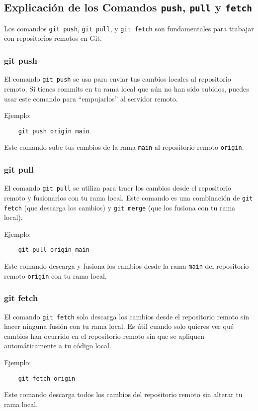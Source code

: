     \subsection{Explicaci\'on de los Comandos \texttt{push}, \texttt{pull} y \texttt{fetch}}

        Los comandos \texttt{git push}, \texttt{git pull}, y \texttt{git fetch} son fundamentales para trabajar con repositorios remotos en Git.

        \subsubsection{git push}

            El comando \texttt{git push} se usa para enviar tus cambios locales al repositorio remoto. Si tienes commits en tu rama local que a\'un no han sido subidos, puedes usar este comando para ``empujarlos'' al servidor remoto.

            Ejemplo:
            \begin{lstlisting}
    git push origin main
            \end{lstlisting}

            Este comando sube tus cambios de la rama \texttt{main} al repositorio remoto \texttt{origin}.

    \subsubsection{git pull}

        El comando \texttt{git pull} se utiliza para traer los cambios desde el repositorio remoto y fusionarlos con tu rama local. Este comando es una combinaci\'on de \texttt{git fetch} (que descarga los cambios) y \texttt{git merge} (que los fusiona con tu rama local).

        Ejemplo:
        \begin{lstlisting}
    git pull origin main
        \end{lstlisting}

        Este comando descarga y fusiona los cambios desde la rama \texttt{main} del repositorio remoto \texttt{origin} con tu rama local.

    \subsubsection{git fetch}

        El comando \texttt{git fetch} solo descarga los cambios desde el repositorio remoto sin hacer ninguna fusi\'on con tu rama local. Es \'util cuando solo quieres ver qu\'e cambios han ocurrido en el repositorio remoto sin que se apliquen autom\'aticamente a tu c\'odigo local.

        Ejemplo:
        \begin{lstlisting}
    git fetch origin
        \end{lstlisting}

        Este comando descarga todos los cambios del repositorio remoto sin alterar tu rama local.